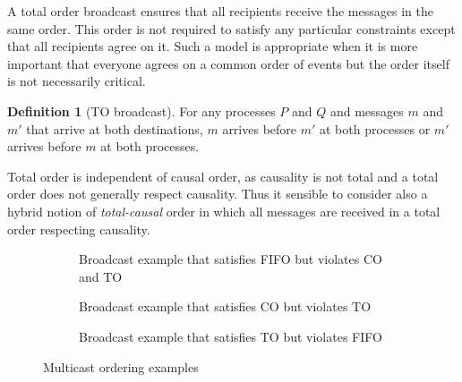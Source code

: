 \documentclass[]             %
{NASA}                       %
\theoremstyle{definition}
\newtheorem{definition}[theorem]{Definition}
\begin{document}
A total order broadcast ensures that all recipients receive the
messages in the same order. This order is not required to satisfy any
particular constraints except that all recipients agree on it. Such a
model is appropriate when it is more important that everyone agrees on
a common order of events but the order itself is not necessarily
critical.

\begin{definition}[TO broadcast]
  \label{def:totalorderbroadcast} For any processes $P$ and $Q$ and
  messages $m$ and $m'$ that arrive at both destinations, $m$ arrives
  before $m'$ at both processes or $m'$ arrives before $m$ at both
  processes.
\end{definition}

Total order is independent of causal order, as causality is not total
and a total order does not generally respect causality. Thus it
sensible to consider also a hybrid notion of \emph{total-causal} order
in which all messages are received in a total order respecting
causality.

\begin{figure}[p]
  \setlength\belowcaptionskip{5ex}
  \begin{subfigure}{1\textwidth}
    \centering
    
    \caption{Broadcast example that satisfies FIFO but violates CO and TO}
    \label{fig:bcast-order-examples-1}
  \end{subfigure}
  \begin{subfigure}{1\textwidth}
    \centering
    
    \caption{Broadcast example that satisfies CO but violates TO}
    \label{fig:bcast-order-examples-2}
  \end{subfigure}
  \begin{subfigure}{1\textwidth}
    \centering
    
    \caption{Broadcast example that satisfies TO but violates FIFO}
    \label{fig:bcast-order-examples-3}
  \end{subfigure}
  \caption{Multicast ordering examples}
  \label{fig:bcast-ordering-examples}
\end{figure}
\end{document}
